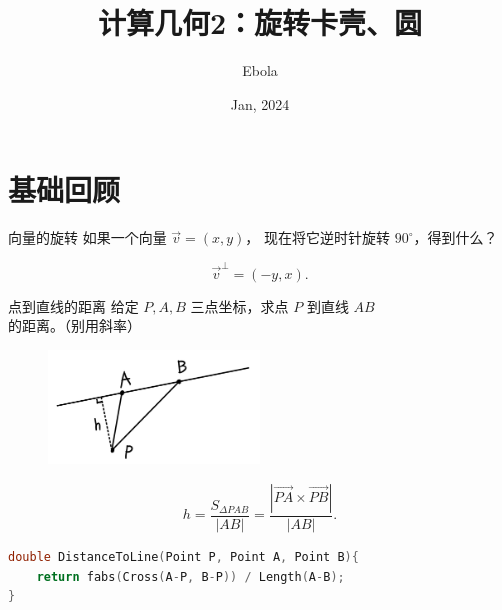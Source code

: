 \documentclass{beamer}
\author{Ebola}
\title{计算几何2：旋转卡壳、圆}
\institute{
    Institute of Mathematics, \\
    Zhejiang University.
}
\date{Jan, 2024}
\begin{document}
\begin{frame}
    \titlepage
\end{frame}

\begin{frame}
    \tableofcontents[sectionstyle=show,subsectionstyle=show/shaded/hide,subsubsectionstyle=show/shaded/hide]
\end{frame}

\section{基础回顾}

\begin{frame}[fragile]{向量的旋转}
    如果一个向量 $\overrightarrow{v}=(x,y)$，
    现在将它逆时针旋转 $90^\circ$，得到什么？

    \vspace{1em}\pause
    \begin{equation}
        \overrightarrow{v}^\perp=(-y,x).
    \end{equation}

\end{frame}

\begin{frame}[fragile]{点到直线的距离}
    \footnotesize
    给定 $P,A,B$ 三点坐标，求点 $P$ 到直线 $AB$ 的距离。（别用斜率）

    \vspace{1em}\pause
    \begin{figure}[H]
        \centering
        \includegraphics[width=0.5\textwidth]{pic/ptl.jpg}
    \end{figure}
    \begin{equation}
        h=\frac{S_{\Delta PAB}}{|AB|}=\frac{|\overrightarrow{PA}\times \overrightarrow{PB}|}{|AB|}.
    \end{equation}

    \vspace{1em}\pause
    \begin{lstlisting}[language=c++]
double DistanceToLine(Point P, Point A, Point B){
    return fabs(Cross(A-P, B-P)) / Length(A-B);
}
    \end{lstlisting}
\end{frame}
\end{document}
